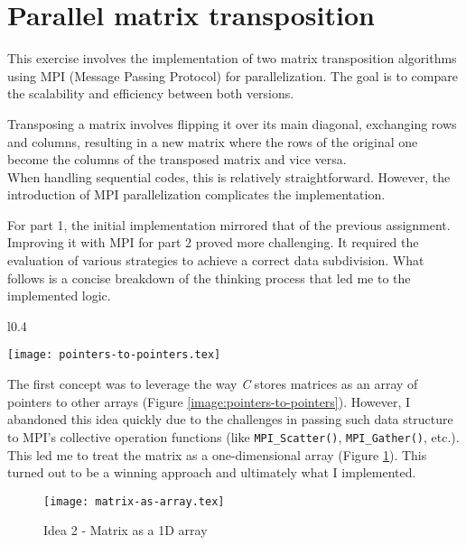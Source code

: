 \section{\label{sec:transposition}Parallel matrix transposition}

This exercise involves the implementation of two matrix transposition algorithms %
using MPI (Message Passing Protocol) for parallelization. The goal is to compare %
the scalability and efficiency between both versions.

Transposing a matrix involves flipping it over its main diagonal, exchanging %
rows and columns, resulting in a new matrix where the rows of the original one %
become the columns of the transposed matrix and vice versa.\\
When handling sequential codes, this is relatively straightforward. However, %
the introduction of MPI parallelization complicates the implementation.

For part 1, the initial implementation mirrored that of the previous assignment. %
Improving it with MPI for part 2 proved more challenging. It required the %
evaluation of various strategies to achieve a correct data subdivision. %
What follows is a concise breakdown of the thinking process that led me to the %
implemented logic.

\begin{wrapfigure}{l}{0.4\textwidth}%
    \vspace{-0.8cm}
    \centering%
    \caption{\label{image:pointers-to-pointers}Idea 1 - Array of pointers to arrays}%
    \texttt{[image: pointers-to-pointers.tex]}%
\end{wrapfigure}%
The first concept was to leverage the way \textit{C} stores matrices as an array %
of pointers to other arrays (Figure \ref{image:pointers-to-pointers}). However, %
I abandoned this idea quickly due to the challenges in passing such data structure to %
MPI's collective operation functions (like \texttt{MPI\_Scatter()}, %
\texttt{MPI\_Gather()}, etc.). This led me to treat the matrix as a one-dimensional %
array (Figure \ref{image:matrix-as-array}). This turned out to be a winning approach %
and ultimately what I implemented.\\%
\begin{figure}[h]%
    \centering%
    \caption{\label{image:matrix-as-array}Idea 2 - Matrix as a 1D array}%
    \texttt{[image: matrix-as-array.tex]}%
\end{figure}%

